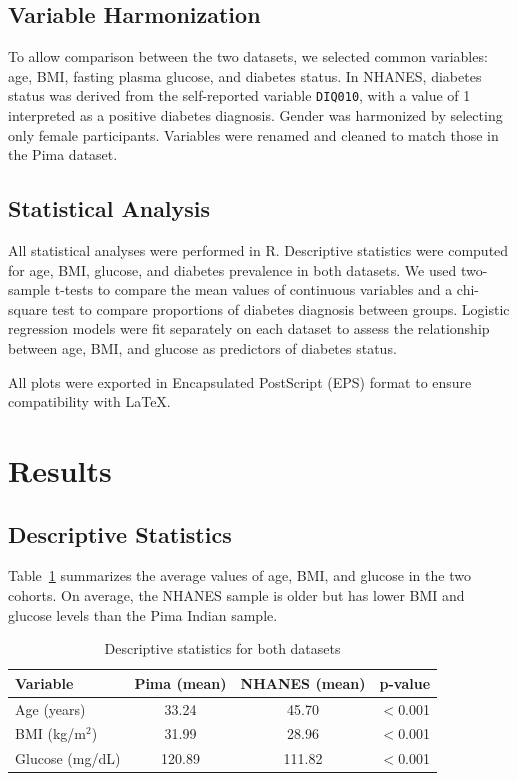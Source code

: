 \documentclass[12pt]{article}
\begin{document}
\subsection{Variable Harmonization}
To allow comparison between the two datasets, we selected common variables: age, BMI, fasting plasma glucose, and diabetes status. In NHANES, diabetes status was derived from the self-reported variable \texttt{DIQ010}, with a value of 1 interpreted as a positive diabetes diagnosis. Gender was harmonized by selecting only female participants. Variables were renamed and cleaned to match those in the Pima dataset.

\subsection{Statistical Analysis}
All statistical analyses were performed in R. Descriptive statistics were computed for age, BMI, glucose, and diabetes prevalence in both datasets. We used two-sample t-tests to compare the mean values of continuous variables and a chi-square test to compare proportions of diabetes diagnosis between groups. Logistic regression models were fit separately on each dataset to assess the relationship between age, BMI, and glucose as predictors of diabetes status.

All plots were exported in Encapsulated PostScript (EPS) format to ensure compatibility with LaTeX.


\section{Results}

\subsection{Descriptive Statistics}
Table~\ref{tab:summary-stats} summarizes the average values of age, BMI, and glucose in the two cohorts. On average, the NHANES sample is older but has lower BMI and glucose levels than the Pima Indian sample.

\begin{table}[H]
\centering
\caption{Descriptive statistics for both datasets}
\label{tab:summary-stats}
\begin{tabular}{lccc}
\toprule
\textbf{Variable} & \textbf{Pima (mean)} & \textbf{NHANES (mean)} & \textbf{p-value} \\
\midrule
Age (years)     & 33.24  & 45.70   & $<$0.001 \\
BMI (kg/m$^2$)  & 31.99  & 28.96   & $<$0.001 \\
Glucose (mg/dL) & 120.89 & 111.82  & $<$0.001 \\
\bottomrule
\end{tabular}
\end{table}
\end{document}
